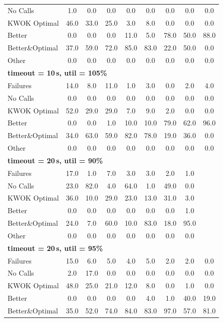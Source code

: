 \begin{tabular}{l cccccccc}
No Calls & 1.0 & 0.0 & 0.0 & 0.0 & 0.0 & 0.0 & 0.0 & 0.0 \\
KWOK Optimal & 46.0 & 33.0 & 25.0 & 3.0 & 8.0 & 0.0 & 0.0 & 0.0 \\
Better & 0.0 & 0.0 & 0.0 & 11.0 & 5.0 & 78.0 & 50.0 & 88.0 \\
Better\&Optimal & 37.0 & 59.0 & 72.0 & 85.0 & 83.0 & 22.0 & 50.0 & 0.0 \\
Other & 0.0 & 0.0 & 0.0 & 0.0 & 0.0 & 0.0 & 0.0 & 0.0 \\
\midrule
\multicolumn{9}{l}{\textbf{timeout = 10\,s, util = 105\%}} \\
\midrule
Failures & 14.0 & 8.0 & 11.0 & 1.0 & 3.0 & 0.0 & 2.0 & 4.0 \\
No Calls & 0.0 & 0.0 & 0.0 & 0.0 & 0.0 & 0.0 & 0.0 & 0.0 \\
KWOK Optimal & 52.0 & 29.0 & 29.0 & 7.0 & 9.0 & 2.0 & 0.0 & 0.0 \\
Better & 0.0 & 0.0 & 1.0 & 10.0 & 10.0 & 79.0 & 62.0 & 96.0 \\
Better\&Optimal & 34.0 & 63.0 & 59.0 & 82.0 & 78.0 & 19.0 & 36.0 & 0.0 \\
Other & 0.0 & 0.0 & 0.0 & 0.0 & 0.0 & 0.0 & 0.0 & 0.0 \\
\midrule
\multicolumn{9}{l}{\textbf{timeout = 20\,s, util = 90\%}} \\
\midrule
Failures & 17.0 & 1.0 & 7.0 & 3.0 & 3.0 & 2.0 & 1.0 & \text{--} \\
No Calls & 23.0 & 82.0 & 4.0 & 64.0 & 1.0 & 49.0 & 0.0 & \text{--} \\
KWOK Optimal & 36.0 & 10.0 & 29.0 & 23.0 & 13.0 & 31.0 & 3.0 & \text{--} \\
Better & 0.0 & 0.0 & 0.0 & 0.0 & 0.0 & 0.0 & 1.0 & \text{--} \\
Better\&Optimal & 24.0 & 7.0 & 60.0 & 10.0 & 83.0 & 18.0 & 95.0 & \text{--} \\
Other & 0.0 & 0.0 & 0.0 & 0.0 & 0.0 & 0.0 & 0.0 & \text{--} \\
\midrule
\multicolumn{9}{l}{\textbf{timeout = 20\,s, util = 95\%}} \\
\midrule
Failures & 15.0 & 6.0 & 5.0 & 4.0 & 5.0 & 2.0 & 2.0 & 0.0 \\
No Calls & 2.0 & 17.0 & 0.0 & 0.0 & 0.0 & 0.0 & 0.0 & 0.0 \\
KWOK Optimal & 48.0 & 25.0 & 21.0 & 12.0 & 8.0 & 0.0 & 1.0 & 0.0 \\
Better & 0.0 & 0.0 & 0.0 & 0.0 & 4.0 & 1.0 & 40.0 & 19.0 \\
Better\&Optimal & 35.0 & 52.0 & 74.0 & 84.0 & 83.0 & 97.0 & 57.0 & 81.0 \\

\end{tabular}
